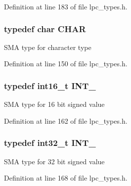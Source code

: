 \-Definition at line 183 of file lpc\-\_\-types.\-h.

\hypertarget{group___l_p_c___types___public___types_gaebb9e13210d88d43e32e735ada43a425}{
\subsubsection[{\-C\-H\-A\-R}]{\setlength{\rightskip}{0pt plus 5cm}typedef char {\bf \-C\-H\-A\-R}}}\label{group___l_p_c___types___public___types_gaebb9e13210d88d43e32e735ada43a425}
\-S\-M\-A type for character type 

\-Definition at line 150 of file lpc\-\_\-types.\-h.

\hypertarget{group___l_p_c___types___public___types_gaae6e34a91bf60db05de64de7720df9a5}{
\subsubsection[{\-I\-N\-T\-\_\-16}]{\setlength{\rightskip}{0pt plus 5cm}typedef int16\-\_\-t {\bf \-I\-N\-T\-\_}}}\label{group___l_p_c___types___public___types_gaae6e34a91bf60db05de64de7720df9a5}
\-S\-M\-A type for 16 bit signed value 

\-Definition at line 162 of file lpc\-\_\-types.\-h.

\hypertarget{group___l_p_c___types___public___types_ga3a17614f3a1b67eaf20781d8ec16a652}{
\subsubsection[{\-I\-N\-T\-\_\-32}]{\setlength{\rightskip}{0pt plus 5cm}typedef int32\-\_\-t {\bf \-I\-N\-T\-\_}}}\label{group___l_p_c___types___public___types_ga3a17614f3a1b67eaf20781d8ec16a652}
\-S\-M\-A type for 32 bit signed value 

\-Definition at line 168 of file lpc\-\_\-types.\-h.

